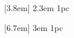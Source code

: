 

	[3.8em] %
	{\vspace{-4pt}} %
	{2.3em} %
	{1pc} %

	[6.7em] %
	{\vspace{-4pt}} %
	{3em} %
	{1pc} %

